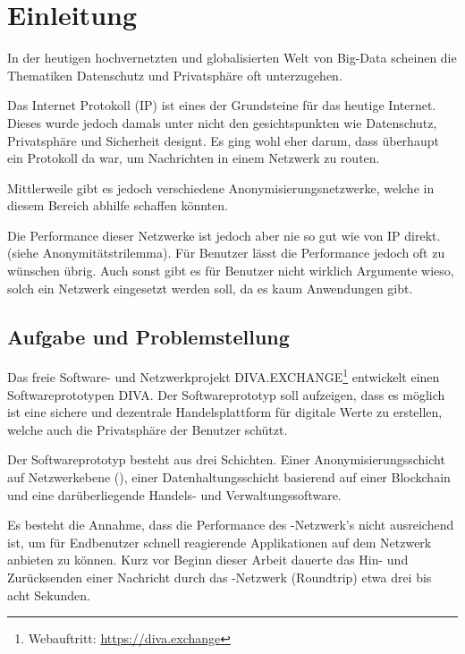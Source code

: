 \chapter{Einleitung}
\label{ch:Einleitung}

In der heutigen hochvernetzten und globalisierten Welt von Big-Data scheinen die Thematiken Datenschutz und Privatsphäre oft unterzugehen.

Das Internet Protokoll (IP) ist eines der Grundsteine für das heutige Internet.
Dieses wurde jedoch damals unter nicht den gesichtspunkten wie Datenschutz, Privatsphäre und Sicherheit designt.
Es ging wohl eher darum, dass überhaupt ein Protokoll da war, um Nachrichten in einem Netzwerk zu routen.

Mittlerweile gibt es jedoch verschiedene Anonymisierungsnetzwerke, welche in diesem Bereich abhilfe schaffen könnten.

Die Performance dieser Netzwerke ist jedoch aber nie so gut wie von IP direkt. (siehe Anonymitätstrilemma).
Für Benutzer lässt die Performance jedoch oft zu wünschen übrig.
Auch sonst gibt es für Benutzer nicht wirklich Argumente wieso, solch ein Netzwerk eingesetzt werden soll, da es kaum Anwendungen gibt.


\section{Aufgabe und Problemstellung}

Das freie Software- und Netzwerkprojekt DIVA.EXCHANGE\footnote{Webauftritt: \url{https://diva.exchange}} entwickelt einen Softwareprototypen DIVA.
Der Softwareprototyp soll aufzeigen, dass es möglich ist eine sichere und dezentrale Handelsplattform für digitale Werte zu erstellen, welche auch die Privatsphäre der Benutzer schützt.

Der Softwareprototyp besteht aus drei Schichten.
Einer Anonymisierungsschicht auf Netzwerkebene (), einer Datenhaltungsschicht basierend auf einer Blockchain und eine darüberliegende Handels- und Verwaltungssoftware.


Es besteht die Annahme, dass die Performance des -Netzwerk's nicht ausreichend ist, um für Endbenutzer schnell reagierende Applikationen auf dem Netzwerk anbieten zu können.
Kurz vor Beginn dieser Arbeit dauerte das Hin- und Zurücksenden einer Nachricht durch das -Netzwerk (Roundtrip) etwa drei bis acht Sekunden.

